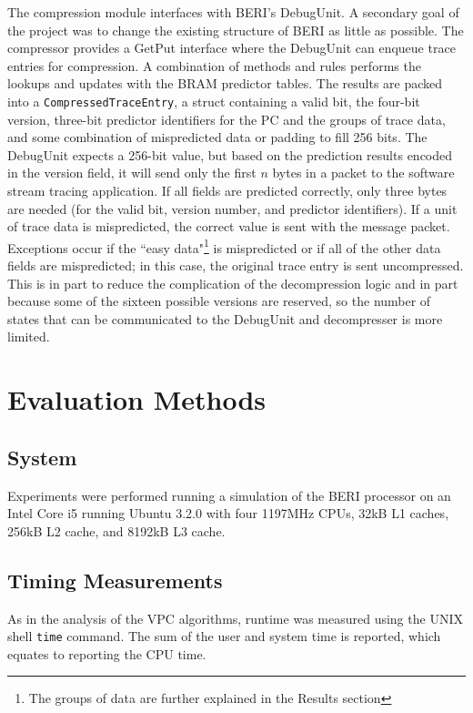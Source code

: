 \documentclass[conference]{IEEEtran}
\begin{document}
The compression module interfaces with BERI's DebugUnit. A secondary goal of the project was to change the existing structure of BERI as little as possible. The compressor provides a GetPut interface where the DebugUnit can enqueue trace entries for compression. A combination of methods and rules performs the lookups and updates with the BRAM predictor tables. The results are packed into a \texttt{CompressedTraceEntry}, a struct containing a valid bit, the four-bit version, three-bit predictor identifiers for the PC and the groups of trace data, and some combination of mispredicted data or padding to fill 256 bits. The DebugUnit expects a 256-bit value, but based on the prediction results encoded in the version field, it will send only the first $n$ bytes in a packet to the software stream tracing application. If all fields are predicted correctly, only three bytes are needed (for the valid bit, version number, and predictor identifiers). If a unit of trace data is mispredicted, the correct value is sent with the message packet. Exceptions occur if the ``easy data"\footnote{The groups of data are further explained in the Results section} is mispredicted or if all of the other data fields are mispredicted; in this case, the original trace entry is sent uncompressed. This is in part to reduce the complication of the decompression logic and in part because some of the sixteen possible versions are reserved, so the number of states that can be communicated to the DebugUnit and decompresser is more limited.  

\section{Evaluation Methods}
\subsection{System}
Experiments were performed running a simulation of the BERI processor on an Intel Core i5 running Ubuntu 3.2.0 with four 1197MHz CPUs, 32kB L1 caches, 256kB L2 cache, and 8192kB L3 cache. 
\subsection{Timing Measurements}
As in the analysis of the VPC algorithms, runtime was measured using the UNIX shell \texttt{time} command. The sum of the user and system time is reported, which equates to reporting the CPU time. 
\end{document}
